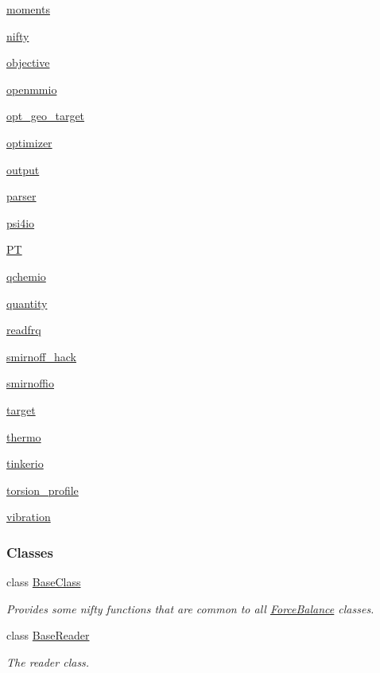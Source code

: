 \begin{DoxyCompactItemize}
 \hyperlink{namespacesrc_1_1moments}{moments}
\item 
 \hyperlink{namespacesrc_1_1nifty}{nifty}
\item 
 \hyperlink{namespacesrc_1_1objective}{objective}
\item 
 \hyperlink{namespacesrc_1_1openmmio}{openmmio}
\item 
 \hyperlink{namespacesrc_1_1opt__geo__target}{opt\+\_\+geo\+\_\+target}
\item 
 \hyperlink{namespacesrc_1_1optimizer}{optimizer}
\item 
 \hyperlink{namespacesrc_1_1output}{output}
\item 
 \hyperlink{namespacesrc_1_1parser}{parser}
\item 
 \hyperlink{namespacesrc_1_1psi4io}{psi4io}
\item 
 \hyperlink{namespacesrc_1_1PT}{PT}
\item 
 \hyperlink{namespacesrc_1_1qchemio}{qchemio}
\item 
 \hyperlink{namespacesrc_1_1quantity}{quantity}
\item 
 \hyperlink{namespacesrc_1_1readfrq}{readfrq}
\item 
 \hyperlink{namespacesrc_1_1smirnoff__hack}{smirnoff\+\_\+hack}
\item 
 \hyperlink{namespacesrc_1_1smirnoffio}{smirnoffio}
\item 
 \hyperlink{namespacesrc_1_1target}{target}
\item 
 \hyperlink{namespacesrc_1_1thermo}{thermo}
\item 
 \hyperlink{namespacesrc_1_1tinkerio}{tinkerio}
\item 
 \hyperlink{namespacesrc_1_1torsion__profile}{torsion\+\_\+profile}
\item 
 \hyperlink{namespacesrc_1_1vibration}{vibration}
\end{DoxyCompactItemize}
\subsubsection*{Classes}
\begin{DoxyCompactItemize}
\item 
class \hyperlink{classsrc_1_1BaseClass}{Base\+Class}
\begin{DoxyCompactList}\small\item\em Provides some nifty functions that are common to all \hyperlink{namespaceForceBalance}{Force\+Balance} classes. \end{DoxyCompactList}\item 
class \hyperlink{classsrc_1_1BaseReader}{Base\+Reader}
\begin{DoxyCompactList}\small\item\em The \textquotesingle{}reader\textquotesingle{} class. \end{DoxyCompactList}\end{DoxyCompactItemize}
